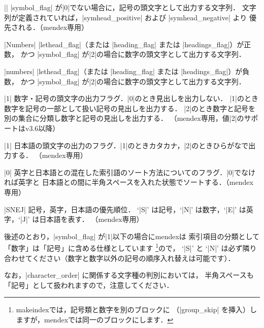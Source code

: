 \documentclass[a4paper,dvipdfmx]{jsarticle}
\newcommand{\SoftName}[1]{\textsf{#1}}
\begin{document}
\begin{description}[leftmargin=3.5cm]
\item[|symbol|] \ParamString*||
|symbol_flag| が|0|でない場合に，記号の頭文字として出力する文字列．
文字列が定義されていれば，|symhead_positive| および |symhead_negative| より
優先される．（\SoftName{mendex}専用）

\item[|numhead\string_positive|] \ParamString*|Numbers|
|lethead_flag|（または |heading_flag| または |headings_flag|）が正数，
かつ |symbol_flag| が|2|の場合に数字の頭文字として出力する文字列．

\item[|numhead\string_negative|] \ParamString*|numbers|
|lethead_flag|（または |heading_flag| または |headings_flag|）が負数，
かつ |symbol_flag| が|2|の場合に数字の頭文字として出力する文字列．

\item[|symbol\string_flag|] \ParamNum|1|
数字・記号の頭文字の出力フラグ．|0|のとき見出しを出力しない．
|1|のとき数字を記号の一部として扱い記号の見出しを出力する．
|2|のとき数字と記号を別の集合に分類し数字と記号の見出しを出力する．
（\SoftName{mendex}専用，値|2|のサポートはv3.6以降）

\item[|letter\string_head|] \ParamNum|1|
日本語の頭文字の出力のフラグ．|1|のときカタカナ，|2|のときひらがなで出力する．
（\SoftName{mendex}専用）

\item[|priority|] \ParamNum|0|
英字と日本語との混在した索引語のソート方法についてのフラグ．|0|でなければ英字と
日本語との間に半角スペースを入れた状態でソートする．（\SoftName{mendex}専用）

\item[|character\string_order|] \ParamString*|SNEJ|
記号，英字，日本語の優先順位．
`|S|' は記号，`|N|' は数字，`|E|' は英字，`|J|' は日本語を表す．
（\SoftName{mendex}専用）

後述のとおり，|symbol_flag| が|1|以下の場合に\SoftName{mendex}は
索引項目の分類として「数字」は「記号」に含める仕様としています
\footnote{\SoftName{makeindex}では，記号類と数字を別のブロックに
（|group\_skip| を挿入）しますが，\SoftName{mendex}では同一のブロックにします．}ので，
`|S|' と `|N|' は必ず隣り合わせてください（数字と数字以外の記号の順序入れ替えは可能です）．

なお，|character_order| に関係する文字種の判別においては，
半角スペースも「記号」として扱われますので，注意してください．
\end{description}
\end{document}
